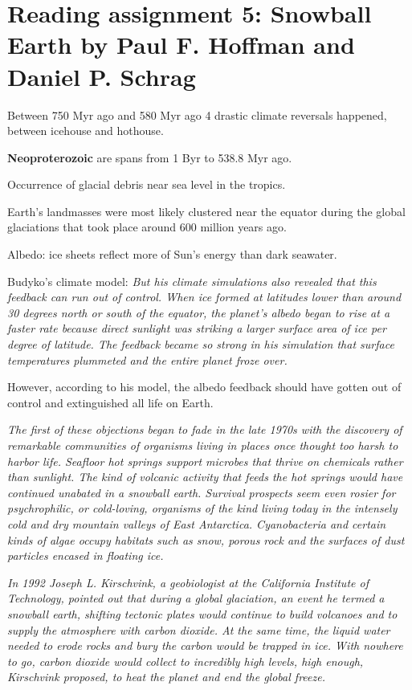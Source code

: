 
\section{Reading assignment 5: Snowball Earth by Paul F. Hoffman and Daniel
P. Schrag}

Between 750 Myr ago and 580 Myr ago 4 drastic climate reversals happened,
between icehouse and hothouse.

\textbf{Neoproterozoic} are spans from 1 Byr to 538.8 Myr ago.

Occurrence of glacial debris near sea level in the tropics.

Earth's landmasses were most likely clustered near the equator during the
global glaciations that took place around 600 million years ago.

Albedo: ice sheets reflect more of Sun's energy than dark seawater.

Budyko's climate model:
\textit{
But his climate simulations also revealed that this feedback can run out of
control. When ice formed at latitudes lower than around 30 degrees north or
south of the equator, the planet’s albedo began to rise at a faster rate
because direct sunlight was striking a larger surface area of ice per degree
of latitude. The feedback became so strong in his simulation that surface
temperatures plummeted and the entire planet froze over.
}

However, according to his model, the albedo feedback should have gotten out of
control and extinguished all life on Earth.

\textit{
The first of these objections began to fade in the late 1970s with the
discovery of remarkable communities of organisms living in places once
thought too harsh to harbor life. Seafloor hot springs support microbes that
thrive on chemicals rather than sunlight. The kind of volcanic activity that
feeds the hot springs would have continued unabated in a snowball earth.
Survival prospects seem even rosier for psychrophilic, or cold-loving,
organisms of the kind living today in the intensely cold and dry mountain
valleys of East Antarctica. Cyanobacteria and certain kinds of algae occupy
habitats such as snow, porous rock and the surfaces of dust particles encased
in floating ice.
}

\textit{
In 1992 Joseph L. Kirschvink, a geobiologist at the California Institute of
Technology, pointed out that during a global glaciation, an event he termed a
snowball earth, shifting tectonic plates would continue to build volcanoes and
to supply the atmosphere with carbon dioxide. At the same time, the liquid
water needed to erode rocks and bury the carbon would be trapped in ice.
With nowhere to go, carbon dioxide would collect to incredibly high levels,
high enough, Kirschvink proposed, to heat the planet and end the global freeze.
}

